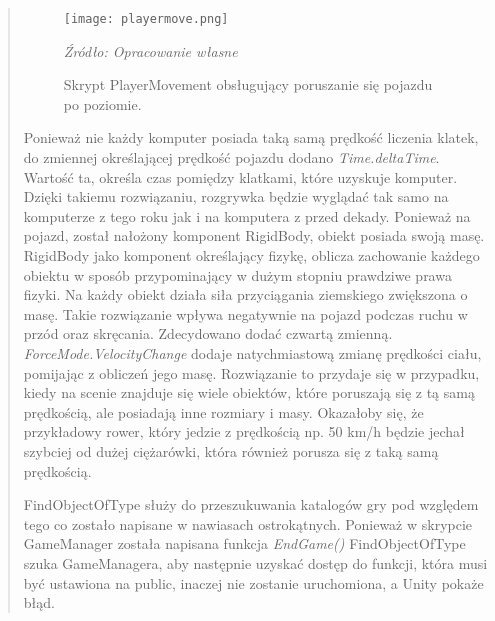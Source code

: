 \begin{quotation}
\begin{figure}[!h]
\centering
  \texttt{[image: playermove.png]}
  \caption{Skrypt PlayerMovement obsługujący poruszanie się pojazdu po poziomie.}\label{rys_21}
  \begin{minipage}[t]{0.75\linewidth}
    \emph{Źródło: Opracowanie własne}
  \end{minipage}
\end{figure}

\newpage
\indent Ponieważ nie każdy komputer posiada taką samą prędkość liczenia klatek, do zmiennej określającej prędkość pojazdu dodano \textit{Time.deltaTime}. Wartość ta, określa czas pomiędzy klatkami, które uzyskuje komputer. Dzięki takiemu rozwiązaniu, rozgrywka będzie wyglądać tak samo na komputerze z tego roku jak i na komputera z przed dekady. \cite{4} Ponieważ na pojazd, został nałożony komponent RigidBody, obiekt posiada swoją masę. RigidBody jako komponent określający fizykę, oblicza zachowanie każdego obiektu w sposób przypominający w dużym stopniu prawdziwe prawa fizyki. Na każdy obiekt działa siła przyciągania ziemskiego zwiększona o masę. Takie rozwiązanie wpływa negatywnie na pojazd podczas ruchu w przód oraz skręcania. Zdecydowano dodać czwartą zmienną. \textit{ForceMode.VelocityChange} dodaje natychmiastową zmianę prędkości ciału, pomijając z obliczeń jego masę. Rozwiązanie to przydaje się w przypadku, kiedy na scenie znajduje się wiele obiektów, które poruszają się z tą samą prędkością, ale posiadają inne rozmiary i masy. Okazałoby się, że przykładowy rower, który jedzie z prędkością np. 50 km/h będzie jechał szybciej od dużej ciężarówki, która również porusza się z taką samą prędkością. \cite{5}

\indent FindObjectOfType służy do przeszukuwania katalogów gry pod względem tego co zostało napisane w nawiasach ostrokątnych. Ponieważ w skrypcie GameManager została napisana funkcja \textit{EndGame()} FindObjectOfType szuka GameManagera, aby następnie uzyskać dostęp do funkcji, która musi być ustawiona na public, inaczej nie zostanie uruchomiona, a Unity pokaże błąd.


\end{quotation}
